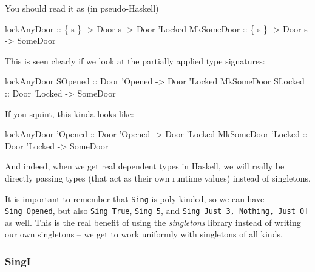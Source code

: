 \documentclass[]{article}
\newenvironment{Shaded}{}{}
\newcommand{\CharTok}[1]{\textcolor[rgb]{0.25,0.44,0.63}{#1}}
\newcommand{\DataTypeTok}[1]{\textcolor[rgb]{0.56,0.13,0.00}{#1}}
\newcommand{\NormalTok}[1]{#1}
\newcommand{\OtherTok}[1]{\textcolor[rgb]{0.00,0.44,0.13}{#1}}
\begin{document}
You should read it as (in pseudo-Haskell)

\begin{Shaded}
\begin{Highlighting}[]
\OtherTok{lockAnyDoor ::}\NormalTok{ \{ s \} }\OtherTok{->} \DataTypeTok{Door}\NormalTok{ s }\OtherTok{->} \DataTypeTok{Door} \CharTok{'Locked}
\DataTypeTok{MkSomeDoor}\OtherTok{  ::}\NormalTok{ \{ s \} }\OtherTok{->} \DataTypeTok{Door}\NormalTok{ s }\OtherTok{->} \DataTypeTok{SomeDoor}
\end{Highlighting}
\end{Shaded}

This is seen clearly if we look at the partially applied type signatures:

\begin{Shaded}
\begin{Highlighting}[]
\NormalTok{lockAnyDoor }\DataTypeTok{SOpened}\OtherTok{ ::} \DataTypeTok{Door} \CharTok{'Opened -> Door '}\DataTypeTok{Locked}
\DataTypeTok{MkSomeDoor}  \DataTypeTok{SLocked}\OtherTok{ ::} \DataTypeTok{Door} \CharTok{'Locked -> SomeDoor}
\end{Highlighting}
\end{Shaded}

If you squint, this kinda looks like:

\begin{Shaded}
\begin{Highlighting}[]
\NormalTok{lockAnyDoor }\CharTok{'Opened :: Door '}\DataTypeTok{Opened} \OtherTok{->} \DataTypeTok{Door} \CharTok{'Locked}
\DataTypeTok{MkSomeDoor}  \CharTok{'Locked :: Door '}\DataTypeTok{Locked} \OtherTok{->} \DataTypeTok{SomeDoor}
\end{Highlighting}
\end{Shaded}

And indeed, when we get real dependent types in Haskell, we will really be
directly passing types (that act as their own runtime values) instead of
singletons.

It is important to remember that \texttt{Sing} is poly-kinded, so we can have
\texttt{Sing\ \textquotesingle{}Opened}, but also
\texttt{Sing\ \textquotesingle{}True}, \texttt{Sing\ 5}, and
\texttt{Sing\ \textquotesingle{}{[}\textquotesingle{}Just\ 3,\ \textquotesingle{}Nothing,\ \textquotesingle{}Just\ 0{]}}
as well. This is the real benefit of using the \emph{singletons} library instead
of writing our own singletons -- we get to work uniformly with singletons of all
kinds.

\hypertarget{singi}{%
\subsubsection{SingI}\label{singi}}
\end{document}
